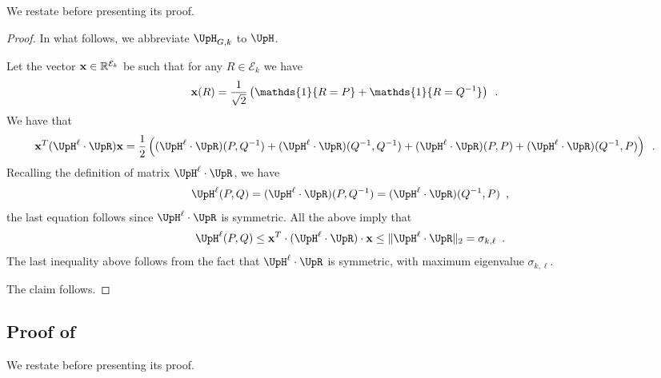 \documentclass[11pt,reqno]{amsart}
\numberwithin{equation}{section}
\newcommand{\cE}{{\mathcal{E}}}
\newcommand{\applegreen}[1]{ {\color{applegreen}#1}}
\newcommand{\amethyst}[1]{{\color{amethyst}#1} }
\newcommand{\bluepigment}[1]{{\color{blue(pigment)}#1}}
\newcommand{\byzantine}[1]{{\color{byzantine}#1}}
\newcommand{\bostonuniversityred}[1]{{\color{bostonuniversityred}#1}}
\newcommand{\cadmiumgreen}[1]{{\color{cadmiumgreen}#1}}
\newcommand{\goldenbrown}[1]{{\color{goldenbrown}#1}}
\newcommand{\heliotrope}[1]{{\color{heliotrope}#1}}
\newcommand{\iris}[1]{{\color{iris}#1}}
\newcommand{\red}[1]{{\color{red}#1}}
\newcommand{\Ind}{\mathds{1}}
\newcommand{\ExtV}{\iris{\cE}}
\newcommand{\norm}[2]{\goldenbrown{\|} #1 \goldenbrown{\|}_{#2}}
\newcommand{\NBMatrix}{\cadmiumgreen{\UpH}_{G,\kk}}
\newcommand{\NBMatrixE}{\byzantine{\UpH}}
\newcommand{\Invol}{\UpR}
\renewcommand{\applegreen}[1]{#1}
\renewcommand{\amethyst}[1]{#1}
\renewcommand{\bluepigment}[1]{#1}
\renewcommand{\byzantine}[1]{#1}
\renewcommand{\bostonuniversityred}[1]{#1}
\renewcommand{\cadmiumgreen}[1]{#1}
\renewcommand{\goldenbrown}[1]{#1}
\renewcommand{\heliotrope}[1]{#1}
\renewcommand{\iris}[1]{#1}
\renewcommand{\red}[1]{#1}
\newcommand{\kk}{\bluepigment{k}}
\newcommand{\kell}{{\color{green(pigment)}\ell}}%
\newcommand{\kP}{\goldenbrown{P}}
\newcommand{\kQ}{\amethyst{Q}}
\newcommand{\kR}{\bostonuniversityred{R}}%
\newcommand{\kx}{\heliotrope{x}}
\renewcommand{\kk}{k}
\renewcommand{\kell}{\ell}
\renewcommand{\kP}{P}
\renewcommand{\kQ}{Q}
\renewcommand{\kR}{R}
\renewcommand{\kx}{x}
\begin{document}
We restate  before presenting its proof.
\hsingpathbound*



\begin{proof}
In what follows, we abbreviate $\NBMatrix$ to $\NBMatrixE$.

Let the vector ${\bf \kx} \in \mathbb{R}^{\ExtV_k}$ be such that for any $\kR\in \ExtV_k$ we have 
\begin{align}
{\bf \kx}(\kR)&=\frac{1}{\sqrt{2}}\left( \Ind\{\kR=\kP\} + \Ind\{\kR=\kQ^{-1}\} \right)\enspace.  
% 
\end{align}
We have that 
\begin{align} \nonumber
{\bf \kx}^T (\NBMatrixE^{\kell} \cdot \Invol){\bf \kx}&=\frac{1}{2}\left((\NBMatrixE^{\kell} \cdot \Invol)(\kP,\kQ^{-1}) 
+(\NBMatrixE^{\kell} \cdot \Invol)(\kQ^{-1}, \kQ^{-1})+(\NBMatrixE^{\kell} \cdot \Invol)(\kP,\kP)+
 (\NBMatrixE^{\kell} \cdot \Invol)(\kQ^{-1}, \kP) \right)\enspace. 
\end{align}
Recalling the definition of matrix $\NBMatrixE^{\kell}\cdot \Invol$, we have 
\begin{align} \nonumber
\NBMatrixE^{\kell}(\kP,\kQ) =(\NBMatrixE^{\kell}\cdot \Invol)(\kP,\kQ^{-1})=(\NBMatrixE^{\kell} \cdot \Invol)(\kQ^{-1},\kP) \enspace,
\end{align}
the last equation follows since $\NBMatrixE^{\kell} \cdot \Invol$ is symmetric. 
All the above imply that
\begin{align} \nonumber
\NBMatrixE^{\kell}(\kP,\kQ) \leq {\bf \kx}^T \cdot (\NBMatrixE^{\kell} \cdot \Invol) \cdot {\bf \kx} 
\leq \norm{ \NBMatrixE^{\kell} \cdot \Invol}{2}=\sigma_{\kk,\kell} \enspace.
\end{align}
The last inequality above follows from the fact that $\NBMatrixE^{\kell}\cdot \Invol$ is symmetric, with maximum
eigenvalue $\sigma_{\kk,\kell}$. 

The claim follows. 
\end{proof}


\subsection{Proof of }\label{sec:lemma:SingSequenConv}

We restate  before presenting its proof.
\hsingseqnondec*
\end{document}
